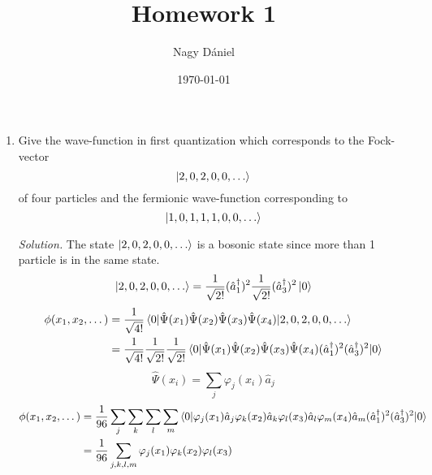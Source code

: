\documentclass[11pt, a4paper]{article}
\title{Homework 1}
\author{Nagy Dániel}
\date{\today}
\begin{document}
\maketitle
\newpage
\begin{enumerate}
    \item Give the wave-function in first quantization which corresponds to the Fock-vector
    \begin{equation*}
        \ket{2,0,2,0,0,\dots}
    \end{equation*}
    of four particles and the fermionic wave-function corresponding to 
    \begin{equation*}
        \ket{1,0,1,1,1,0,0,\dots}
    \end{equation*}
    \par \textit{Solution.}
    The state $\ket{2,0,2,0,0,\dots}$ is a bosonic state since more than 1 particle is in the same state.
    \begin{equation*}
        \ket{2,0,2,0,0,\dots} = \frac{1}{\sqrt {2!}}(\hat a_1^{\dagger})^2\frac{1}{\sqrt {2!}}(\hat a_3^{\dagger})^2\ket 0
    \end{equation*}
    \begin{align*}
        \phi(x_1, x_2, \dots) &= \frac{1}{\sqrt{4!}}\braket{0|\hat\Psi(x_1)\hat\Psi(x_2)\hat\Psi(x_3)\hat\Psi(x_4)|2,0,2,0,0,\dots}\\
                              &= \frac{1}{\sqrt{4!}}\frac{1}{\sqrt {2!}}\frac{1}{\sqrt {2!}}
                              \braket{0|\hat\Psi(x_1)\hat\Psi(x_2)\hat\Psi(x_3)\hat\Psi(x_4)(\hat a_1^{\dagger})^2(\hat a_3^{\dagger})^2|0}
    \end{align*}
    \begin{equation*}
        \hat\Psi(x_i) = \sum\limits_j \varphi_j(x_i)\hat a_j
    \end{equation*}
    \begin{align*}
        \phi(x_1, x_2, \dots) & = \frac{1}{96} \sum\limits_j\sum\limits_k\sum\limits_l\sum\limits_m
                              \braket{0|\varphi_j(x_1)\hat a_j \varphi_k(x_2)\hat a_k \varphi_l(x_3)
                              \hat a_l \varphi_m(x_4)\hat a_m (\hat a_1^{\dagger})^2(\hat a_3^{\dagger})^2|0}\\
                              & = \frac{1}{96} \sum\limits_{j,k,l,m}\varphi_j(x_1)\varphi_k(x_2)\varphi_l(x_3)

\end{align*}
\end{enumerate}
\end{document}
